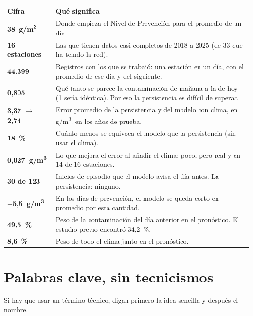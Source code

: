 \documentclass[11pt,a4paper]{article}
\newcommand{\ug}{\textmu g/m\textsuperscript{3}}
\newcommand{\flecha}{\ensuremath{\rightarrow}}
\begin{document}
\renewcommand{\arraystretch}{1.25}
\begin{tabularx}{\textwidth}{>{\sffamily\bfseries}l X}
\toprule
\normalfont\textsf{Cifra} & \textsf{Qué significa} \\
\midrule
38~\ug & Donde empieza el Nivel de Prevención para el promedio de un día. \\
16 estaciones & Las que tienen datos casi completos de 2018 a 2025 (de 33 que ha tenido la red). \\
44.399 & Registros con los que se trabajó: una estación en un día, con el promedio de ese día y del siguiente. \\
0,805 & Qué tanto se parece la contaminación de mañana a la de hoy (1 sería idéntica). Por eso la persistencia es difícil de superar. \\
3,37 \flecha{} 2,74 & Error promedio de la persistencia y del modelo con clima, en \ug, en los años de prueba. \\
18~\% & Cuánto menos se equivoca el modelo que la persistencia (sin usar el clima). \\
0,027~\ug & Lo que mejora el error al añadir el clima: poco, pero real y en 14 de 16 estaciones. \\
30 de 123 & Inicios de episodio que el modelo avisa el día antes. La persistencia: ninguno. \\
$-$5,5~\ug & En los días de prevención, el modelo se queda corto en promedio por esta cantidad. \\
49,5~\% & Peso de la contaminación del día anterior en el pronóstico. El estudio previo encontró 34,2~\%. \\
8,6~\% & Peso de todo el clima junto en el pronóstico. \\
\bottomrule
\end{tabularx}

\section{Palabras clave, sin tecnicismos}

Si hay que usar un término técnico, digan primero la idea sencilla y después el nombre.
\end{document}
